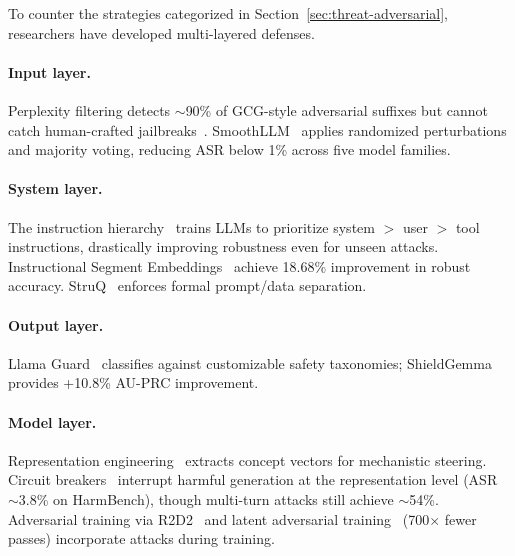To counter the strategies categorized in Section~\ref{sec:threat-adversarial}, researchers have developed multi-layered defenses.

\paragraph{Input layer.}
Perplexity filtering detects $\sim$90\% of GCG-style adversarial suffixes but cannot catch human-crafted jailbreaks~\cite{alon2023perplexity}. SmoothLLM~\cite{robey2023smoothllm} applies randomized perturbations and majority voting, reducing ASR below 1\% across five model families.

\paragraph{System layer.}
The instruction hierarchy~\cite{wallace2024hierarchy} trains LLMs to prioritize system $>$ user $>$ tool instructions, drastically improving robustness even for unseen attacks. Instructional Segment Embeddings~\cite{wu2025ise} achieve 18.68\% improvement in robust accuracy. StruQ~\cite{chen2025struq} enforces formal prompt/data separation.

\paragraph{Output layer.}
Llama Guard~\cite{inan2023llamaguard} classifies against customizable safety taxonomies; ShieldGemma~\cite{zeng2024shieldgemma} provides +10.8\% AU-PRC improvement.

\paragraph{Model layer.}
Representation engineering~\cite{zou2023repe} extracts concept vectors for mechanistic steering. Circuit breakers~\cite{zou2024circuitbreakers} interrupt harmful generation at the representation level (ASR $\sim$3.8\% on HarmBench), though multi-turn attacks still achieve $\sim$54\%. Adversarial training via R2D2~\cite{mazeika2024harmbench} and latent adversarial training~\cite{sheshadri2024lat} (700$\times$ fewer passes) incorporate attacks during training.

